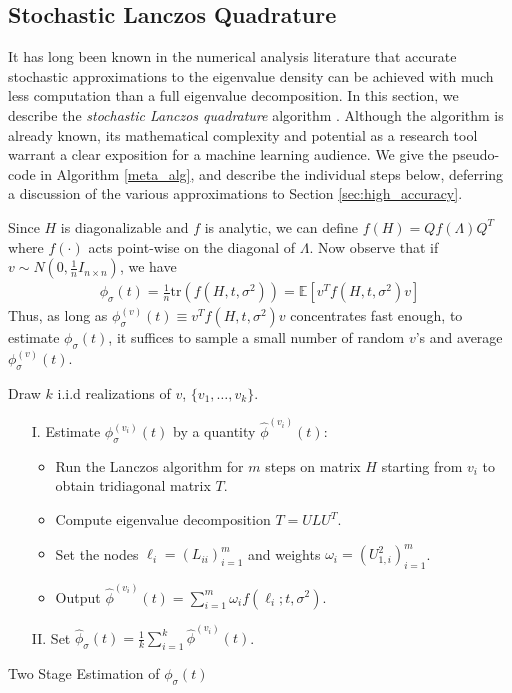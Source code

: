 \documentclass{article}
\newcommand{\tr}[1]{\mathrm{tr} \left(#1\right)}
\newcommand{\phis}{\phi_{\sigma}}
\newcommand{\phisv}{\phis^{(v)}}
\newcommand{\E}[1]{\mathbb{E}\left[#1\right]}
\begin{document}
\subsection{Stochastic Lanczos Quadrature}
It has long been known in the numerical analysis literature that accurate stochastic approximations to the eigenvalue density can be achieved with much less computation than a full eigenvalue decomposition. In this section, we describe the \emph{stochastic Lanczos quadrature} algorithm \cite{golub1969calculation}. Although the algorithm is already known, its mathematical complexity and potential as a research tool warrant a clear exposition for a machine learning audience.  We give the pseudo-code in Algorithm \ref{meta_alg}, and describe the individual steps below, deferring a discussion of the various approximations to Section \ref{sec:high_accuracy}.

Since $H$ is diagonalizable and $f$ is analytic, we can define $f(H) = Q f(\Lambda) Q^T$ where $f(\cdot)$ acts point-wise on the diagonal of $\Lambda$. Now observe that if $v \sim N(0, \frac{1}{n} I_{n \times n})$, we have
\begin{align}
\phis(t) = \frac{1}{n} \tr{f(H, t, \sigma^2)} = \E{v^T f(H, t, \sigma^2) v} \label{eqn:smoothed}
\end{align}
Thus, as long as $\phisv(t) \equiv v^T f(H, t, \sigma^2) v$ concentrates fast enough, to estimate $\phis(t)$, it suffices to sample a small number of random $v$'s and average $\phisv(t)$.

\begin{algorithm}[H] 
Draw $k$ i.i.d realizations of $v$, $\{v_1 , \dots, v_k\}$.\;
\begin{itemize}
\item[I.]  Estimate $\phis^{(v_i)}(t)$ by a quantity $\widehat{\phi}^{(v_i)}(t)$:
\begin{itemize}
    \item Run the Lanczos algorithm for $m$ steps on matrix $H$ starting from $v_i$ to obtain tridiagonal matrix $T$.
    \item Compute eigenvalue decomposition $T = ULU^T$.
    \item Set the nodes $\ell_i = (L_{ii})_{i=1}^m$ and weights $\omega_i = (U^2_{1,i})_{i=1}^m$.
    \item Output $\widehat{\phi}^{(v_i)}(t) = \sum_{i=1}^m \omega_i f(\ell_i; t, \sigma^2)$.
\end{itemize}
\item[II.] Set $\widehat{\phi}_{\sigma}(t) = \frac{1}{k}\sum_{i=1}^k \widehat{\phi}^{(v_i)}(t)$.
\end{itemize}
\caption{Two Stage Estimation of $\phis(t)$} \label{meta_alg}
\end{algorithm}
\end{document}

